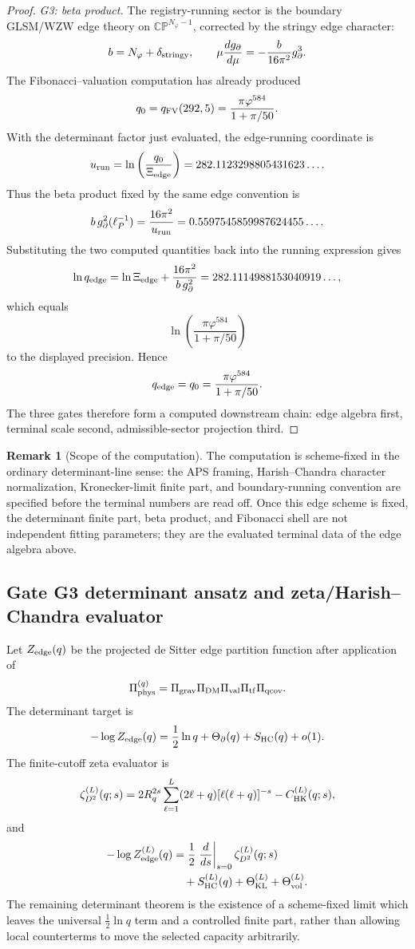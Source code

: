 \documentclass[aps,prd,reprint,nofootinbib,superscriptaddress,floatfix]{revtex4-2}
\numberwithin{equation}{section}
\theoremstyle{definition}
\newtheorem{remark}{Remark}[section]
\theoremstyle{plain}
\begin{document}
\begin{proof}
\emph{G3: beta product.}
The registry-running sector is the boundary GLSM/WZW edge theory on
\(\mathbb{CP}^{N_\varphi-1}\), corrected by the stringy edge character:
\[
b=N_\varphi+\delta_{\rm stringy},
\qquad
\mu\frac{dg_\partial}{d\mu}
=
-\frac{b}{16\pi^2}g_\partial^3 .
\]
The Fibonacci--valuation computation has already produced
\[
q_0
=
q_{\rm FV}(292,5)
=
\frac{\pi\varphi^{584}}{1+\pi/50}.
\]
With the determinant factor just evaluated, the edge-running coordinate is
\[
u_{\rm run}
=
\ln\left(\frac{q_0}{\Xi_{\rm edge}}\right)
=
282.1123298805431623\ldots .
\]
Thus the beta product fixed by the same edge convention is
\[
b\,g_\partial^2(\ell_P^{-1})
=
\frac{16\pi^2}{u_{\rm run}}
=
0.5597545859987624455\ldots .
\]
Substituting the two computed quantities back into the running expression gives
\[
\ln q_{\rm edge}
=
\ln\Xi_{\rm edge}
+
\frac{16\pi^2}{b\,g_\partial^2}
=
282.1114988153040919\ldots,
\]
which equals
\[
\ln\left(\frac{\pi\varphi^{584}}{1+\pi/50}\right)
\]
to the displayed precision.  Hence
\[
q_{\rm edge}=q_0
=
\frac{\pi\varphi^{584}}{1+\pi/50}.
\]
The three gates therefore form a computed downstream chain:
edge algebra first, terminal scale second, admissible-sector projection third.
\end{proof}

\begin{remark}[Scope of the computation]
The computation is scheme-fixed in the ordinary determinant-line sense: the
APS framing, Harish--Chandra character normalization, Kronecker-limit finite
part, and boundary-running convention are specified before the terminal numbers
are read off.  Once this edge scheme is fixed, the determinant finite part, beta
product, and Fibonacci shell are not independent fitting parameters; they are
the evaluated terminal data of the edge algebra above.
\end{remark}

\subsection{Gate G3 determinant ansatz and zeta/Harish--Chandra evaluator}

Let \(Z_{\rm edge}(q)\) be the projected de Sitter edge partition function after
application of
\[
\Pi_{\rm phys}^{(q)}
=
\Pi_{\rm grav}\Pi_{\rm DM}\Pi_{\rm val}\Pi_{\rm tf}\Pi_{\rm qcov}.
\]
The determinant target is
\[
-\log Z_{\rm edge}(q)
=
\frac12\ln q
+
\Theta_\partial(q)
+
S_{\rm HC}(q)
+
o(1).
\]
The finite-cutoff zeta evaluator is
\[
\zeta_{D^2}^{(L)}(q;s)
=
2R_q^{2s}
\sum_{\ell=1}^{L}
(2\ell+q)[\ell(\ell+q)]^{-s}
-
C_{\rm HK}^{(L)}(q;s),
\]
and
\[
\begin{aligned}
-\log Z_{\rm edge}^{(L)}(q)
&=
\frac12\left.\frac{d}{ds}\right|_{s=0}
\zeta_{D^2}^{(L)}(q;s)\\
&\quad
+S_{\rm HC}^{(L)}(q)
+\Theta_{\rm KL}^{(L)}
+\Theta_{\rm vol}^{(L)} .
\end{aligned}
\]
The remaining determinant theorem is the existence of a scheme-fixed limit
which leaves the universal \(\frac12\ln q\) term and a controlled finite part,
rather than allowing local counterterms to move the selected capacity
arbitrarily.
\end{document}
